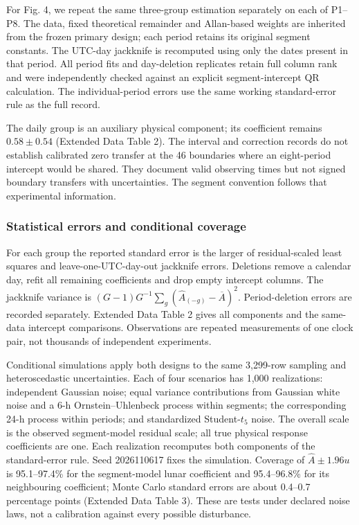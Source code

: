 \documentclass[
  12pt,
  a4paper,
]{article}
\begin{document}
For Fig. 4, we repeat the same three-group estimation separately on each
of P1--P8. The data, fixed theoretical remainder and Allan-based weights
are inherited from the frozen primary design; each period retains its
original segment constants. The UTC-day jackknife is recomputed using
only the dates present in that period. All period fits and day-deletion
replicates retain full column rank and were independently checked
against an explicit segment-intercept QR calculation. The
individual-period errors use the same working standard-error rule as the
full record.

The daily group is an auxiliary physical component; its coefficient
remains \(0.58\pm0.54\) (Extended Data Table 2). The interval and
correction records do not establish calibrated zero transfer at the 46
boundaries where an eight-period intercept would be shared. They
document valid observing times but not signed boundary transfers with
uncertainties. The segment convention follows that experimental
information.

\hypertarget{statistical-errors-and-conditional-coverage}{%
\subsubsection{Statistical errors and conditional
coverage}\label{statistical-errors-and-conditional-coverage}}

For each group the reported standard error is the larger of
residual-scaled least squares and leave-one-UTC-day-out jackknife
errors. Deletions remove a calendar day, refit all remaining
coefficients and drop empty intercept columns. The jackknife variance is
\((G-1)G^{-1}\sum_g(\hat A_{(-g)}-\overline A)^2\). Period-deletion
errors are recorded separately. Extended Data Table 2 gives all
components and the same-data intercept comparisons. Observations are
repeated measurements of one clock pair, not thousands of independent
experiments.

Conditional simulations apply both designs to the same 3,299-row
sampling and heteroscedastic uncertainties. Each of four scenarios has
1,000 realizations: independent Gaussian noise; equal variance
contributions from Gaussian white noise and a 6-h Ornstein--Uhlenbeck
process within segments; the corresponding 24-h process within periods;
and standardized Student-\(t_5\) noise. The overall scale is the
observed segment-model residual scale; all true physical response
coefficients are one. Each realization recomputes both components of the
standard-error rule. Seed 2026110617 fixes the simulation. Coverage of
\(\hat A\pm1.96u\) is 95.1--97.4\% for the segment-model lunar
coefficient and 95.4--96.8\% for its neighbouring coefficient; Monte
Carlo standard errors are about 0.4--0.7 percentage points (Extended
Data Table 3). These are tests under declared noise laws, not a
calibration against every possible disturbance.
\end{document}

